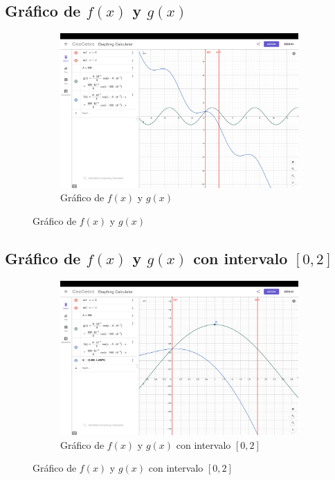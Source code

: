 \subsection{Gráfico de $f(x)$ y $g(x)$}
\begin{figure}[H]
    \centering
    \begin{subfigure}[b]{\textwidth}
        \centering
        \includegraphics[width=\textwidth]{Figures/0. General/3.1.1.png}
        \caption{Gráfico de $f(x)$ y $g(x)$}
        \label{fig: Grafico de f(x) y g(x) de Kingping}
    \end{subfigure}
\end{figure}

\subsection{Gráfico de $f(x)$ y $g(x)$ con intervalo $[0,2]$}
\begin{figure}[H]
    \centering
    \begin{subfigure}[b]{\textwidth}
        \centering
        \includegraphics[width=\textwidth]{Figures/0. General/3.1.2.png}
        \caption{Gráfico de $f(x)$ y $g(x)$ con intervalo $[0,2]$}
        \label{fig: Grafico de f(x) y g(x) con intervalo [0,2] de Kingping}
    \end{subfigure}
\end{figure}

